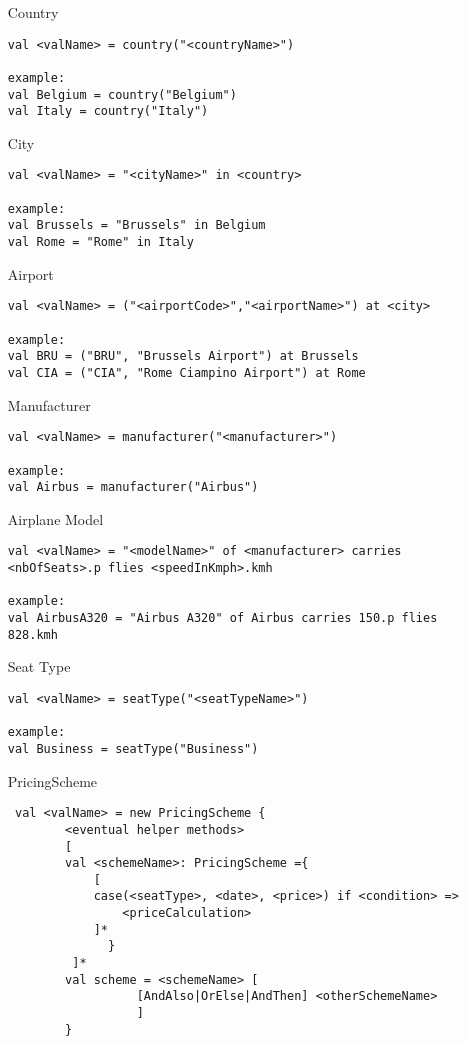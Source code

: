 \begin{itemize}
\item[Country] 
\begin{lstlisting}
val <valName> = country("<countryName>")

example:
val Belgium = country("Belgium")
val Italy = country("Italy")
\end{lstlisting}

\item[City] 
\begin{lstlisting}
val <valName> = "<cityName>" in <country>

example:
val Brussels = "Brussels" in Belgium
val Rome = "Rome" in Italy
\end{lstlisting}

\item[Airport]
\begin{lstlisting}
val <valName> = ("<airportCode>","<airportName>") at <city>
   
example:
val BRU = ("BRU", "Brussels Airport") at Brussels
val CIA = ("CIA", "Rome Ciampino Airport") at Rome
\end{lstlisting}

\item[Manufacturer]
\begin{lstlisting}
val <valName> = manufacturer("<manufacturer>")

example:
val Airbus = manufacturer("Airbus")
\end{lstlisting}

 \item[Airplane Model]
\begin{lstlisting}
val <valName> = "<modelName>" of <manufacturer> carries <nbOfSeats>.p flies <speedInKmph>.kmh

example:
val AirbusA320 = "Airbus A320" of Airbus carries 150.p flies 828.kmh
\end{lstlisting}

 \item[Seat Type]
\begin{lstlisting}
val <valName> = seatType("<seatTypeName>")

example:
val Business = seatType("Business")
\end{lstlisting}

\item[PricingScheme]
\begin{lstlisting}
 val <valName> = new PricingScheme {
		<eventual helper methods>
		[
		val <schemeName>: PricingScheme ={
			[
			case(<seatType>, <date>, <price>) if <condition> =>
			    <priceCalculation>
			]*
		      }
		 ]*
		val scheme = <schemeName> [
			      [AndAlso|OrElse|AndThen] <otherSchemeName>
				  ]
		}
	

\end{lstlisting}
\end{itemize}
